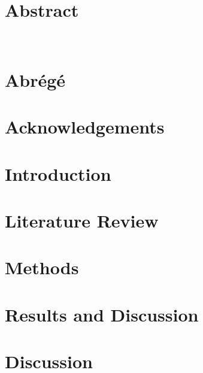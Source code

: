 \documentclass[12pt]{report}
\begin{document}


\renewcommand{\thepage}{\roman{page}}%
 
\tableofcontents





\chapter*{Abstract}



\\
\chapter*{Abr\'eg\'e}



\chapter*{Acknowledgements}



\chapter{Introduction}
\renewcommand{\thepage}{\arabic{page}}%
\setcounter{page}{1}%




\chapter{Literature Review}\label{literature_review}


\chapter{Methods}\label{methods}

\chapter{Results and Discussion}\label{results}

\chapter{Discussion}\label{discussion}

\end{document}
